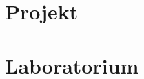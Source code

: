 \documentclass{mwrep}
\begin{document}
\part{Projekt}
\label{PROJEKT}






\part{Laboratorium}
\label{LAB}




\end{document}
